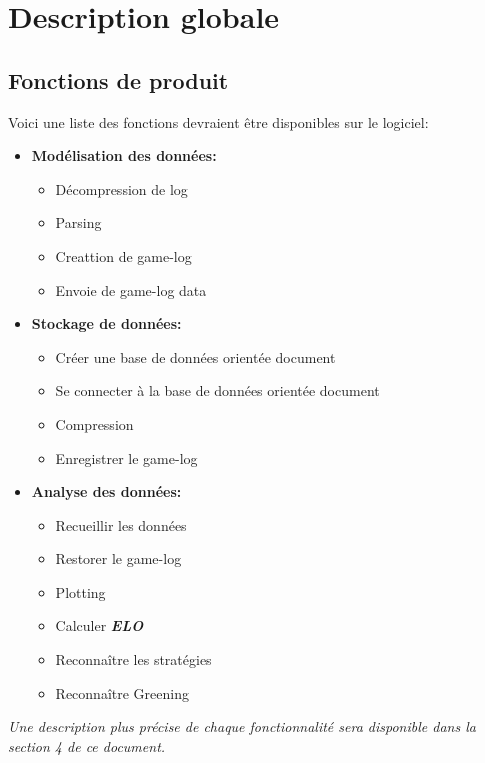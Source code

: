\documentclass{scrreprt}
\begin{document}
\chapter{Description globale}


\section{Fonctions de produit}

Voici une liste des fonctions devraient être disponibles sur le logiciel:
\begin{itemize}


  \item{\textbf{Modélisation des données:}}
    \begin{itemize}
    \item{Décompression de log}
    \item{Parsing}
    \item{Creattion de game-log}
    \item{Envoie de game-log data}
    \end{itemize}
  \item{\textbf{Stockage de données:}}
    \begin{itemize}
    \item{Créer une base de données orientée document}
    \item{Se connecter à la base de données orientée document}
    \item{Compression}
    \item{Enregistrer le game-log}
    \end{itemize}
  \item{\textbf{Analyse des données:}}
    \begin{itemize}
      \item{Recueillir les données}
      \item{Restorer le game-log}
      \item{Plotting}
      \item{Calculer \textit{\textbf{ELO}}}
      \item{Reconnaître les stratégies}
      \item{Reconnaître Greening}
    \end{itemize}
\end{itemize}
\textit{ Une description plus précise de chaque fonctionnalité sera disponible dans la section 4 de ce document. }
\end{document}

